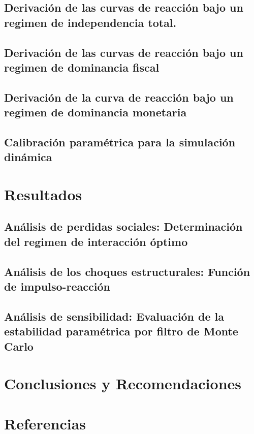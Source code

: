 \documentclass[
  authoryear,
  preprint]{elsarticle}
\begin{document}
\subsection{Derivación de las curvas de reacción bajo un regimen de
independencia
total.}\label{derivaciuxf3n-de-las-curvas-de-reacciuxf3n-bajo-un-regimen-de-independencia-total.}

\subsection{Derivación de las curvas de reacción bajo un regimen de
dominancia
fiscal}\label{derivaciuxf3n-de-las-curvas-de-reacciuxf3n-bajo-un-regimen-de-dominancia-fiscal}

\subsection{Derivación de la curva de reacción bajo un regimen de
dominancia
monetaria}\label{derivaciuxf3n-de-la-curva-de-reacciuxf3n-bajo-un-regimen-de-dominancia-monetaria}

\subsection{Calibración paramétrica para la simulación
dinámica}\label{calibraciuxf3n-paramuxe9trica-para-la-simulaciuxf3n-dinuxe1mica}

\section{Resultados}\label{resultados}

\subsection{Análisis de perdidas sociales: Determinación del regimen de
interacción
óptimo}\label{anuxe1lisis-de-perdidas-sociales-determinaciuxf3n-del-regimen-de-interacciuxf3n-uxf3ptimo}

\subsection{Análisis de los choques estructurales: Función de
impulso-reacción}\label{anuxe1lisis-de-los-choques-estructurales-funciuxf3n-de-impulso-reacciuxf3n}

\subsection{Análisis de sensibilidad: Evaluación de la estabilidad
paramétrica por filtro de Monte
Carlo}\label{anuxe1lisis-de-sensibilidad-evaluaciuxf3n-de-la-estabilidad-paramuxe9trica-por-filtro-de-monte-carlo}

\section{Conclusiones y
Recomendaciones}\label{conclusiones-y-recomendaciones}

\section{Referencias}\label{referencias}

\renewcommand{\bibsection}{}

\end{document}
